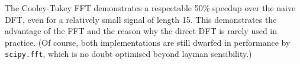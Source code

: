 The Cooley-Tukey FFT demonstrates a respectable 50\% speedup over the naive DFT, even for a relatively small signal of length 15. This demonstrates the advantage of the FFT and the reason why the direct DFT is rarely used in practice. (Of course, both implementations are still dwarfed in performance by \texttt{scipy.fft}, which is no doubt optimised beyond layman sensibility.)
